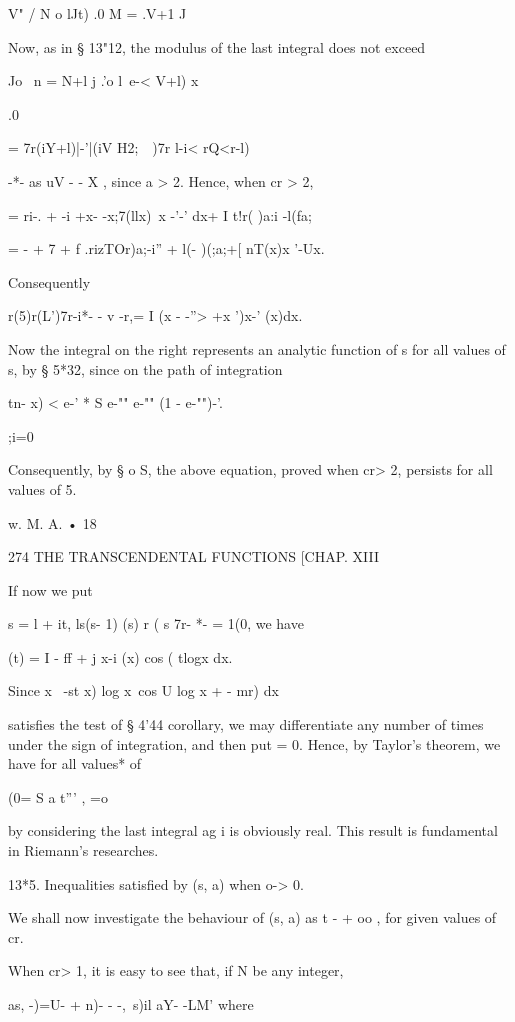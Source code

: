 V" / N o lJt) .0 M = .V+1 J 

Now, as in § 13"12, the modulus of the last integral does not exceed 

Jo \ n = N+l j .'o l\ e-< V+l) x 

.0 

=  7r(iY+l)|-'|(iV H2;\ \  )7r l-i< rQ<r-l) 

-*- as uV - - X , since a > 2. 
Hence, when cr > 2, 

= ri-.  +  -i +x- -x;7(llx)\ x -'-' dx+ I t!r( )a:i -l(fa; 

= - + 7  + f .rizTOr)a;-i'' + l(- )(;a;+[ nT(x)x '-Ux. 

Consequently 

r(5)r(L')7r-i*- - v -r,= I (x - -''> +x ')x-' (x)dx. 

Now the integral on the right represents an analytic function of s for all 
values of s, by § 5*32, since on the path of integration 

tn-  x) < e-' * S e-""   e-""  (1 - e-"")-'. 

;i=0 

Consequently, by § o S, the above equation, proved when cr> 2, persists for 
all values of 5. 

w. M. A. • 18 



274 THE TRANSCENDENTAL FUNCTIONS [CHAP. XIII 

If now we put 

s = l + it, ls(s- 1)  (s) r (  s  7r- *- = 1(0, 
we have 

  (t) = I - ff  + j x-i  (x) cos (  tlogx  dx. 

Since x~ -st x)  log x\ cos U   log x + -  mr) dx 

satisfies the test of § 4'44 corollary, we may differentiate any number of times 
under the sign of integration, and then put   = 0. Hence, by Taylor's 
theorem, we have for all values* of   

 (0= S a t''' , 
 =o 

by considering the last integral ag i is obviously real. 
This result is fundamental in Riemann's researches. 

13*5. Inequalities satisfied by  (s, a) when o-> 0. 

We shall now investigate the behaviour of  (s, a) as t - + oo , for given values of cr. 

When cr> 1, it is easy to see that, if N be any integer, 

as, -)=U- + n)- -  -,\ s)il aY-  -LM'  
where 

